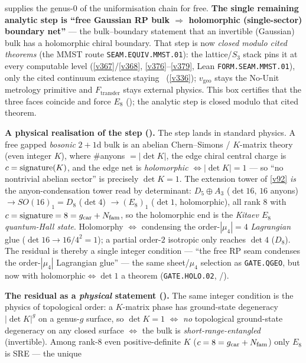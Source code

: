 \begin{keybox}
supplies the genus-$0$ of the uniformisation chain for free. \textbf{The single remaining analytic step is
``free Gaussian RP bulk $\Rightarrow$ holomorphic (single-sector) boundary net''} --- the bulk--boundary
statement that an invertible (Gaussian) bulk has a holomorphic chiral boundary. That step is now \emph{closed
modulo cited theorems} (the MMST route \texttt{SEAM.EQUIV.MMST.01}): the lattice/$S_3$ stack pins it at every
computable level (\vref{v367}/\vref{v368},
\vref{v376}--\vref{v379}, Lean \texttt{FORM.SEAM.MMST.01}), only the cited continuum existence staying \mO\
(\vref{v336}); $v_{\mathrm{geo}}$ stays the No-Unit metrology primitive and
$F_{\mathrm{transfer}}$ stays external physics. This box certifies that the three faces coincide and
force $E_8$ (\mE); the analytic step is closed modulo that cited theorem.
\par\smallskip\noindent\textbf{A physical realisation of the step ().}
The step lands in standard physics. A free gapped \emph{bosonic} $2{+}1$d bulk is an abelian
Chern--Simons / $K$-matrix theory (even integer $K$), where $\#$anyons $=|\det K|$, the edge chiral central
charge is $c={\rm signature}(K)$, and the edge net is \emph{holomorphic} $\Leftrightarrow|\det K|=1$ --- so
``no nontrivial abelian sector'' is precisely $\det K=1$. The extension tower of \vref{v92} \emph{is} the
anyon-condensation tower read by determinant: $D_5{\oplus}A_3$ ($\det16$, $16$ anyons) $\to SO(16)_1{=}D_8$
($\det4$) $\to (E_8)_1$ ($\det1$, holomorphic), all rank $8$ with $c={\rm signature}=8=g_{\mathrm{car}}+N_{\mathrm{fam}}$, so the
holomorphic end is the \emph{Kitaev $E_8$ quantum-Hall state}. Holomorphy $\Leftrightarrow$ condensing the
order-$|\mu_4|=4$ \emph{Lagrangian} glue ($\det16{\to}16/4^2{=}1$); a partial order-$2$ isotropic only
reaches $\det4$ ($D_8$). The residual is thereby a single integer condition --- ``the free RP seam condenses
the order-$|\mu_4|$ Lagrangian glue'' --- the same sheet/$\mu_4$ selection as \texttt{GATE.QGEO}, but now with
$\text{holomorphic}\Leftrightarrow\det1$ a theorem (\texttt{GATE.HOLO.02}, \mE/\mO).
\par\smallskip\noindent\textbf{The residual as a \emph{physical} statement ().}
The same integer condition is the physics of topological order: a $K$-matrix phase has ground-state
degeneracy $|\det K|^g$ on a genus-$g$ surface, so $\det K=1$ $\Leftrightarrow$ \emph{no} topological
ground-state degeneracy on any closed surface $\Leftrightarrow$ the bulk is \emph{short-range-entangled}
(invertible). Among rank-$8$ even positive-definite $K$ ($c=8=g_{\mathrm{car}}+N_{\mathrm{fam}}$) only $E_8$ is SRE --- the unique

\end{keybox}
